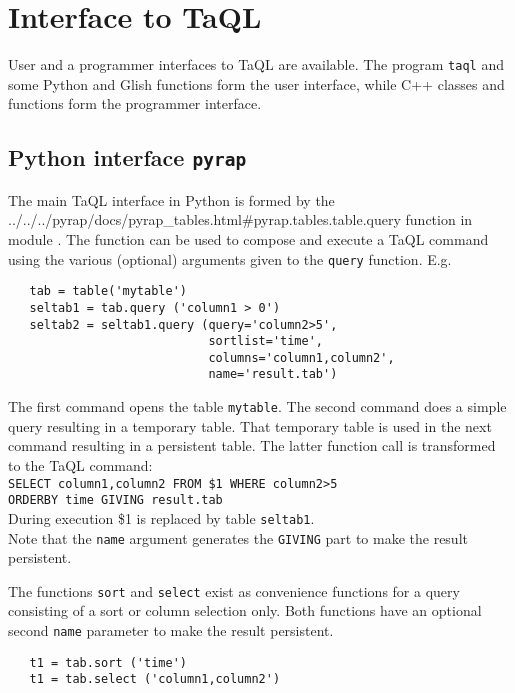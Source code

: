 \section{\label{TAQL:GLISHPC}Interface to TaQL}
User and a programmer interfaces to TaQL are available.
The program \texttt{taql} and some Python and Glish functions form the
user interface, while C++ classes and functions
form the programmer interface.

\subsection{Python interface \texttt{pyrap}}
  The main TaQL interface in Python is formed by the
  {../../../pyrap/docs/pyrap_tables.html\#pyrap.tables.table.query} function in module
  .
  The function can be used
  to compose and execute a TaQL command using the various (optional)
  arguments given to the \texttt{query} function. E.g.
\begin{verbatim}
   tab = table('mytable')
   seltab1 = tab.query ('column1 > 0')
   seltab2 = seltab1.query (query='column2>5',
                            sortlist='time',
                            columns='column1,column2',
                            name='result.tab')
\end{verbatim}
  The first command opens the table \texttt{mytable}.
  The second command does a simple query resulting in a temporary
  table. That temporary table is used in the next command resulting in
  a persistent table. The latter function call is transformed to
  the TaQL command:
  \\\texttt{SELECT column1,column2 FROM \$1 WHERE column2>5}
  \\\texttt{ORDERBY time GIVING result.tab}
  \\During execution \$1 is replaced by table \texttt{seltab1}.
  \\Note that the \texttt{name} argument
  generates the \texttt{GIVING} part to make the result persistent.

  The functions \texttt{sort} and \texttt{select} exist as convenience
  functions for a query consisting of a sort or  column selection
  only. Both functions have an optional second \texttt{name} parameter
  to make the result persistent.
\begin{verbatim}
   t1 = tab.sort ('time')
   t1 = tab.select ('column1,column2')
\end{verbatim}

